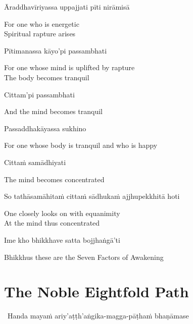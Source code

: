 Āraddhavīriyassa uppajjati pīti nirāmisā

\begin{english}
  For one who is energetic\\
  Spiritual rapture arises
\end{english}

Pītimanassa kāyo'pi passambhati

\begin{english}
  For one whose mind is uplifted by rapture\\
  The body becomes tranquil
\end{english}

Cittam'pi passambhati

\begin{english}
  And the mind becomes tranquil
\end{english}

Passaddhakāyassa sukhino

\begin{english}
  For one whose body is tranquil and who is happy
\end{english}

Cittaṁ samādhiyati

\begin{english}
  The mind becomes concentrated
\end{english}

So tathāsamāhitaṁ cittaṁ sādhukaṁ ajjhupekkhitā hoti

\begin{english}
  One closely looks on with equanimity\\
  At the mind thus concentrated
\end{english}

\suttaRef{[SN 46.3]}

Ime kho bhikkhave satta bojjhaṅgā'ti

\begin{english}
  Bhikkhus these are the Seven Factors of Awakening
\end{english}

\suttaRef{[SN 46.22]}


\section{The Noble Eightfold Path}
\label{noble-eightfold-path}

\begin{leader}
  \anglebracketleft\ \hspace{-0.5mm}Handa mayaṁ ariy'aṭṭh'aṅgika-magga-pāṭhaṁ bhaṇāmase \hspace{-0.5mm}\anglebracketright\
\end{leader}

